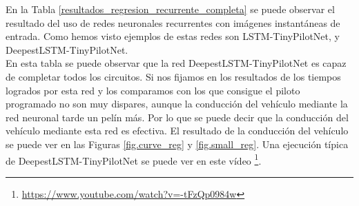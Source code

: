 En la Tabla \ref{resultados_regresion_recurrente_completa} se puede observar el resultado del uso de redes neuronales recurrentes con imágenes instantáneas de entrada. Como hemos visto ejemplos de estas redes son LSTM-TinyPilotNet, y DeepestLSTM-TinyPilotNet.\\

En esta tabla se puede observar que la red DeepestLSTM-TinyPilotNet es capaz de completar todos los circuitos. Si nos fijamos en los resultados de los tiempos logrados por esta red y los comparamos con los que consigue el piloto programado no son muy dispares, aunque la conducción del vehículo mediante la red neuronal tarde un pelín más. Por lo que se puede decir que la conducción del vehículo mediante esta red es efectiva. El resultado de la conducción del vehículo se puede ver en las Figuras \ref{fig.curve_reg} y \ref{fig.small_reg}. Una ejecución típica de DeepestLSTM-TinyPilotNet se puede ver en este vídeo  \footnote{\url{https://www.youtube.com/watch?v=-tFzQp0984w}}.\\

